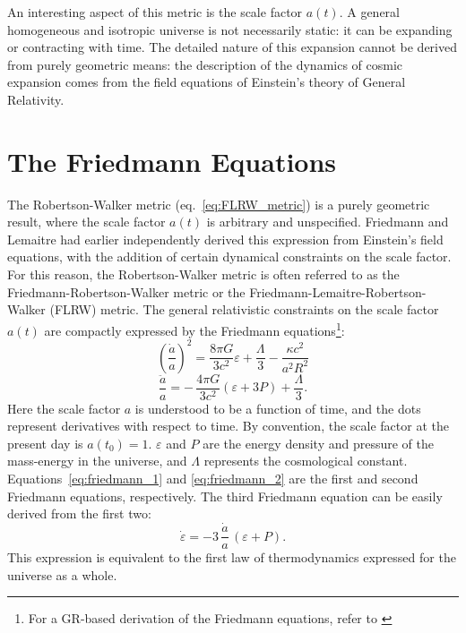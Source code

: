 An interesting aspect of this metric is the scale factor $a(t)$.  A general
homogeneous and isotropic universe is not necessarily static: it can be
expanding or contracting with time.  The detailed nature of this expansion
cannot be derived from purely geometric means: the description of the dynamics
of cosmic expansion comes from the field equations of Einstein's theory
of General Relativity.

\section{The Friedmann Equations}
\label{sec:friedmann}
The Robertson-Walker metric (eq.~\ref{eq:FLRW_metric})
is a purely geometric result,
where the scale factor $a(t)$ is arbitrary and unspecified.
Friedmann and Lemaitre had earlier independently derived this expression
from Einstein's field equations, with the addition of certain dynamical
constraints on the scale factor.  For this reason, the Robertson-Walker
metric is often referred to as the Friedmann-Robertson-Walker metric
or the Friedmann-Lemaitre-Robertson-Walker (FLRW) metric.
The general relativistic constraints on the scale factor $a(t)$
are compactly expressed by the Friedmann
equations\footnote{For a GR-based derivation of the Friedmann
  equations, refer to \citet{peebles1993principles}}:
\begin{equation}
  \label{eq:friedmann_1}
  \left(\frac{\dot{a}}{a}\right)^2
  = \frac{8\pi G}{3c^2}\varepsilon
  + \frac{\Lambda}{3} - \frac{\kappa c^2}{a^2 R^2}
\end{equation}
\begin{equation}
  \label{eq:friedmann_2}
  \frac{\ddot{a}}{a}
  = -\,\frac{4\pi G}{3c^2}(\varepsilon + 3P) + \frac{\Lambda}{3}.
\end{equation}
Here the scale factor $a$ is understood to be a function of time, and the
dots represent derivatives with respect to time.
By convention, the scale factor at the present day is $a(t_0) = 1$.
$\varepsilon$ and $P$ are
the energy density and pressure of the mass-energy in the universe, and
$\Lambda$ represents the cosmological constant.
Equations~\ref{eq:friedmann_1} and \ref{eq:friedmann_2} are the first and
second Friedmann equations, respectively.  The third Friedmann equation
can be easily derived from the first two:
\begin{equation}
  \label{eq:friedmann_3}
  \dot{\varepsilon} = -3\,\frac{\dot{a}}{a}\,(\varepsilon + P).
\end{equation}
This expression is equivalent to the first law of thermodynamics
expressed for the universe as a whole.

